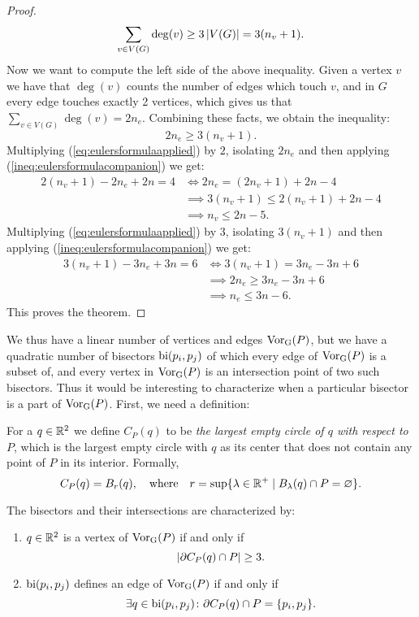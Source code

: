 \begin{proof}
\[
    \sum_{v \in V(G)} \deg(v) \geq 3 \left\lvert V(G) \right\rvert = 3(n_v + 1).
\]
Now we want to compute the left side of the above inequality. Given a vertex $v$ we have that $\deg(v)$ counts the number of edges which touch $v$, and in $G$ every edge touches exactly 2 vertices, which gives us that $\sum_{v \in V(G)} \deg(v) = 2 n_e$. Combining these facts, we obtain the inequality:
\begin{equation} \label{ineq:eulersformulacompanion}
    2 n_e \geq 3(n_v + 1).
\end{equation}
Multiplying (\ref{eq:eulersformulaapplied}) by $2$, isolating $2 n_e$ and then applying (\ref{ineq:eulersformulacompanion}) we get:
\begin{align*}
    2 (n_v + 1) - 2 n_e + 2 n = 4
    &\iff 2 n_e = (2 n_v + 1) + 2n - 4 \\
    &\implies 3(n_v + 1) \leq 2 (n_v + 1) + 2n - 4 \\
    &\implies n_v \leq 2n - 5.
\end{align*}
Multiplying (\ref{eq:eulersformulaapplied}) by $3$, isolating $3 (n_v + 1)$ and then applying (\ref{ineq:eulersformulacompanion}) we get:
\begin{align*}
    3 (n_v + 1) - 3 n_e + 3 n = 6
    &\iff 3 (n_v + 1) = 3 n_e - 3n + 6 \\
    &\implies 2 n_e \geq 3n_e - 3n + 6 \\
    &\implies n_e \leq 3n - 6.
\end{align*}
This proves the theorem.
\end{proof}
We thus have a linear number of vertices and edges $\operatorname{Vor_{G}}(P)$, but we have a quadratic number of bisectors $\operatorname{bi}(p_i, p_j)$ of which every edge of $\operatorname{Vor_{G}}(P)$ is a subset of, and every vertex in $\operatorname{Vor_{G}}(P)$ is an intersection point of two such bisectors. Thus it would be interesting to characterize when a particular bisector is a part of $\operatorname{Vor_{G}}(P)$. First, we need a definition:
\newpage
\begin{defn}
For a $q \in \mathbb{R}^2$ we define $C_P(q)$ to be \emph{the largest empty circle of $q$ with respect to $P$}, which is the largest empty circle with $q$ as its center that does not contain any point of $P$ in its interior. Formally,
\[
    C_P(q) = B_r(q), \quad \text{where} \quad r = \sup\{\lambda \in \mathbb{R}^+ \mid B_{\lambda}(q) \cap P = \varnothing\}.
\]
\end{defn}
\begin{thm} \label{thm:characterizationofbisectors} The bisectors and their intersections are characterized by:
\begin{enumerate}[{(}i{)}]
    \item $q \in \mathbb{R}^2$ is a vertex of $\operatorname{Vor_{G}}(P)$ if and only if \[ \left\lvert \partial C_P(q) \cap P \right\rvert \geq 3. \]
    \item $\operatorname{bi}(p_i, p_j)$ defines an edge of $\operatorname{Vor_{G}}(P)$ if and only if \[ \exists q \in \operatorname{bi}(p_i, p_j) \colon \partial C_P(q) \cap P = \{p_i, p_j\}. \]
\end{enumerate}
\end{thm}
